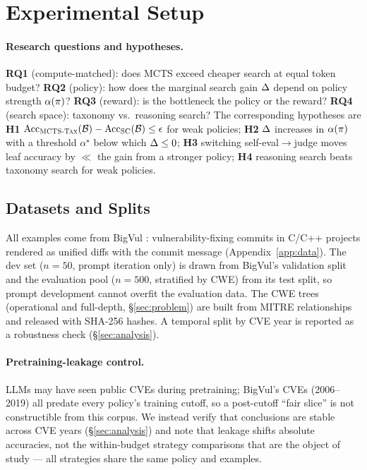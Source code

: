 \section{Experimental Setup}
\label{sec:experiments}

\paragraph{Research questions and hypotheses.}
\textbf{RQ1} (compute-matched): does MCTS exceed cheaper search at equal token
budget? \textbf{RQ2} (policy): how does the marginal search gain $\Delta$ depend on
policy strength $\alpha(\pi)$? \textbf{RQ3} (reward): is the bottleneck the policy or
the reward? \textbf{RQ4} (search space): taxonomy vs.\ reasoning search?
The corresponding hypotheses are
\textbf{H1} $\mathrm{Acc}_{\textsc{MCTS-Tax}}(\mathcal{B}) - \mathrm{Acc}_{\text{SC}}(\mathcal{B}) \le \epsilon$ for
weak policies;
\textbf{H2} $\Delta$ increases in $\alpha(\pi)$ with a threshold $\alpha^\star$ below
which $\Delta \le 0$;
\textbf{H3} switching self-eval$\to$judge moves leaf accuracy by $\ll$ the gain
from a stronger policy;
\textbf{H4} reasoning search beats taxonomy search for weak policies.

\subsection{Datasets and Splits}
All examples come from BigVul \citep{fan2020bigvul}: vulnerability-fixing
commits in C/C++ projects rendered as unified diffs with the commit message
(Appendix~\ref{app:data}). The dev set ($n{=}50$, prompt iteration only) is
drawn from BigVul's validation split and the evaluation pool ($n{=}500$,
stratified by CWE) from its test split, so prompt development cannot overfit
the evaluation data. The CWE trees (operational and full-depth,
\S\ref{sec:problem}) are built from MITRE relationships and released with
SHA-256 hashes. A temporal split by CVE year is reported as a robustness check
(\S\ref{sec:analysis}).

\paragraph{Pretraining-leakage control.}
LLMs may have seen public CVEs during pretraining; BigVul's CVEs (2006--2019)
all predate every policy's training cutoff, so a post-cutoff ``fair slice'' is
not constructible from this corpus. We instead verify that conclusions are
stable across CVE years (\S\ref{sec:analysis}) and note that leakage shifts
absolute accuracies, not the within-budget strategy comparisons that are the
object of study --- all strategies share the same policy and examples.

